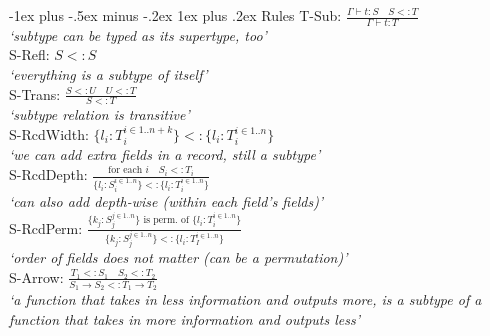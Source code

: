 \documentclass[letterpaper, 8pt]{extarticle}
\makeatletter
\renewcommand{\subsubsection}{\@startsection{subsubsection}{3}{0mm}%
                                {-1ex plus -.5ex minus -.2ex}%
                                {1ex plus .2ex}%
                                {\normalfont\tiny\bfseries}}
\makeatother
\begin{document}
\begin{multicols*}{4}
    \subsubsection{Rules}
    T-Sub: \(\frac{\Gamma \vdash t : S \quad S <: T}{\Gamma \vdash t : T}\)\\
    \textit{`subtype can be typed as its supertype, too'}\\
    S-Refl: \(S <: S\)\\
    \textit{`everything is a subtype of itself'}\\
    S-Trans: \(\frac{S<: U \quad U<:T}{S<:T}\)\\
    \textit{`subtype relation is transitive'}\\
    S-RcdWidth: \(\{ l_{i}: T_{i}^{i \in  1..n +k} \} <: \{ l_{i}: T_{i}^{i \in  1..n} \}\)\\
    \textit{`we can add extra fields in a record, still a subtype'}\\
    S-RcdDepth: \(\frac{\text{for each } i \quad S_{i} <: T_{i}}{\{ l_{i}: S_{i}^{i \in  1..n } \} <: \{ l_{i}: T_{i}^{i \in  1..n} \}}\)\\
    \textit{`can also add depth-wise (within each field's fields)'}\\
    S-RcdPerm: \(\frac{\{k_{j} :S_{j}^{j \in 1..n}\} \text{ is perm. of } \{l_{i}:T_{i}^{i \in 1..n} \}}{\{k_{j}:S_{j}^{j \in 1..n} \} <: \{l_{i}: T_{I}^{i \in 1..n} \}}\)\\
    \textit{`order of fields does not matter (can be a permutation)'}\\
    S-Arrow: \(\frac{T_{1} <: S_{1} \quad S_{2} <: T_{2}}{S_{1} \to S_{2} <: T_{1} \to T_{2}}\)\\
    \textit{`a function that takes in less information and outputs more, is a subtype of a function that takes in more information and outputs less'}\newline


\end{multicols*}
\end{document}
